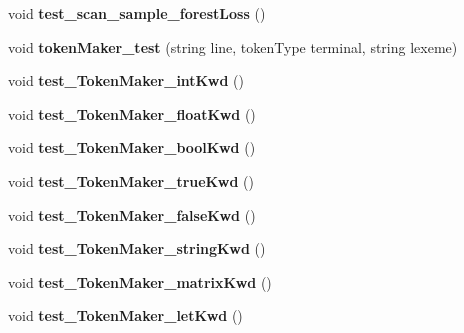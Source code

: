 \begin{DoxyCompactItemize}
\item 
\hypertarget{classScannerTestSuite_a8248f8bda6c9909971ef13f1364ab8f8}{void {\bfseries test\-\_\-scan\-\_\-sample\-\_\-forest\-Loss} ()}\label{classScannerTestSuite_a8248f8bda6c9909971ef13f1364ab8f8}

\item 
\hypertarget{classScannerTestSuite_a85d91624b470d65d466390110d74ab99}{void {\bfseries token\-Maker\-\_\-test} (string line, token\-Type terminal, string lexeme)}\label{classScannerTestSuite_a85d91624b470d65d466390110d74ab99}

\item 
\hypertarget{classScannerTestSuite_afd03fbc31003d1be155fba2a3c98b71c}{void {\bfseries test\-\_\-\-Token\-Maker\-\_\-int\-Kwd} ()}\label{classScannerTestSuite_afd03fbc31003d1be155fba2a3c98b71c}

\item 
\hypertarget{classScannerTestSuite_a78fc1b6a686d36de0d9653aaddf4ad88}{void {\bfseries test\-\_\-\-Token\-Maker\-\_\-float\-Kwd} ()}\label{classScannerTestSuite_a78fc1b6a686d36de0d9653aaddf4ad88}

\item 
\hypertarget{classScannerTestSuite_a816712d2c5ec0ef7ef3361dc5a80eb51}{void {\bfseries test\-\_\-\-Token\-Maker\-\_\-bool\-Kwd} ()}\label{classScannerTestSuite_a816712d2c5ec0ef7ef3361dc5a80eb51}

\item 
\hypertarget{classScannerTestSuite_aa9d32f82e08ccc810fca495f4628c2a7}{void {\bfseries test\-\_\-\-Token\-Maker\-\_\-true\-Kwd} ()}\label{classScannerTestSuite_aa9d32f82e08ccc810fca495f4628c2a7}

\item 
\hypertarget{classScannerTestSuite_ab96166b93c96fea8c7e4c5cc44961d39}{void {\bfseries test\-\_\-\-Token\-Maker\-\_\-false\-Kwd} ()}\label{classScannerTestSuite_ab96166b93c96fea8c7e4c5cc44961d39}

\item 
\hypertarget{classScannerTestSuite_a15ec232bf3903ec8527b0a3e37cc443e}{void {\bfseries test\-\_\-\-Token\-Maker\-\_\-string\-Kwd} ()}\label{classScannerTestSuite_a15ec232bf3903ec8527b0a3e37cc443e}

\item 
\hypertarget{classScannerTestSuite_a5d766dff9b08ee580133f042d9e42ea1}{void {\bfseries test\-\_\-\-Token\-Maker\-\_\-matrix\-Kwd} ()}\label{classScannerTestSuite_a5d766dff9b08ee580133f042d9e42ea1}

\item 
\hypertarget{classScannerTestSuite_a6d80c8fac5af9493b09c0cafa42191bf}{void {\bfseries test\-\_\-\-Token\-Maker\-\_\-let\-Kwd} ()}\label{classScannerTestSuite_a6d80c8fac5af9493b09c0cafa42191bf}


\end{DoxyCompactItemize}
